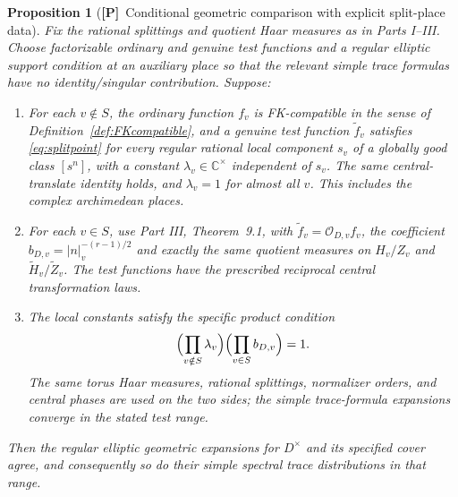 \documentclass[11pt]{article}
\newcommand{\Ptag}{\textnormal{\textbf{[P]}}}
\theoremstyle{plain}
\newtheorem{proposition}[theorem]{Proposition}
\theoremstyle{definition}
\begin{document}
\begin{proposition}[\Ptag\ Conditional geometric comparison with
explicit split-place data]\label{prop:conditionalglobal}
Fix the rational splittings and quotient Haar measures as in
Parts I--III.  Choose factorizable ordinary and genuine test
functions and a regular elliptic support condition at an auxiliary
place so that the relevant simple trace formulas have no
identity/singular contribution.  Suppose:
\begin{enumerate}[label=(\roman*)]
\item For each $v\notin S$, the ordinary function $f_v$ is
FK-compatible in the sense of Definition~\ref{def:FKcompatible},
and a genuine test function $\widetilde f_v$ satisfies
\eqref{eq:splitpoint} for every regular rational local component
$s_v$ of a globally good class $[s^n]$, with a constant
$\lambda_v\in\mathbb C^\times$ independent of $s_v$.
The same central-translate identity holds, and
$\lambda_v=1$ for almost all $v$.  This includes the complex
archimedean places.
\item For each $v\in S$, use Part III, Theorem~9.1, with
$\widetilde f_v=\mathcal O_{D,v}f_v$, the coefficient
$b_{D,v}=|n|_v^{-(r-1)/2}$ and exactly the same quotient
measures on $H_v/Z_v$ and $\widetilde H_v/\widetilde Z_v$.
The test functions have the prescribed reciprocal central
transformation laws.
\item The local constants satisfy the \emph{specific} product
condition
\begin{equation}\label{eq:lambda-product}
 \Bigl(\prod_{v\notin S}\lambda_v\Bigr)
 \Bigl(\prod_{v\in S} b_{D,v}\Bigr)=1.
\end{equation}
The same torus Haar measures, rational splittings, normalizer
orders, and central phases are used on the two sides; the
simple trace-formula expansions converge in the stated test range.
\end{enumerate}
Then the regular elliptic geometric expansions for $D^\times$
and its specified cover agree, and consequently so do their
simple spectral trace distributions in that range.
\end{proposition}
\end{document}

